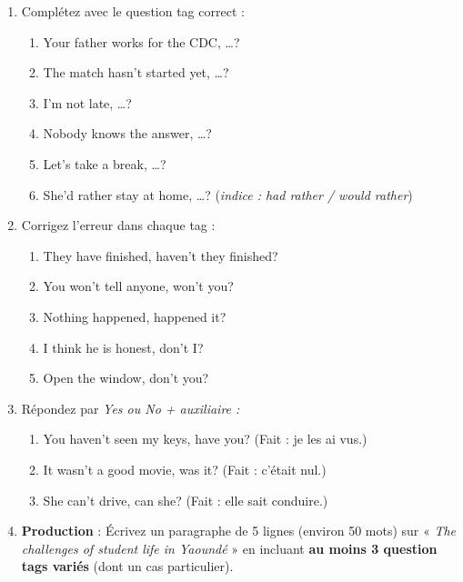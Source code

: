 \documentclass[11pt]{article}
\newcommand{\eng}[1]{\ifmmode\text{\textit{#1}}\else\begingroup\selectlanguage{english}\itshape #1\endgroup\fi}
\begin{document}
\begin{exercice}
\begin{enumerate}
\item Complétez avec le question tag correct :
  \begin{enumerate}
  \item Your father works for the CDC, \ldots ?
  \item The match hasn't started yet, \ldots ?
  \item I'm not late, \ldots ?
  \item Nobody knows the answer, \ldots ?
  \item Let's take a break, \ldots ?
  \item She'd rather stay at home, \ldots ? (\textit{indice : had rather / would rather})
  \end{enumerate}
\item Corrigez l'erreur dans chaque tag :
  \begin{enumerate}
  \item They have finished, haven't they finished?
  \item You won't tell anyone, won't you?
  \item Nothing happened, happened it?
  \item I think he is honest, don't I?
  \item Open the window, don't you?
  \end{enumerate}
\item Répondez par \eng{Yes} ou \eng{No} + auxiliaire :
  \begin{enumerate}
  \item You haven't seen my keys, have you? (Fait : je les ai vus.)
  \item It wasn't a good movie, was it? (Fait : c'était nul.)
  \item She can't drive, can she? (Fait : elle sait conduire.)
  \end{enumerate}
\item \textbf{Production} : Écrivez un paragraphe de 5 lignes (environ 50 mots) sur « \emph{The challenges of student life in Yaoundé} » en incluant \textbf{au moins 3 question tags variés} (dont un cas particulier).
\end{enumerate}
\end{exercice}
\end{document}
